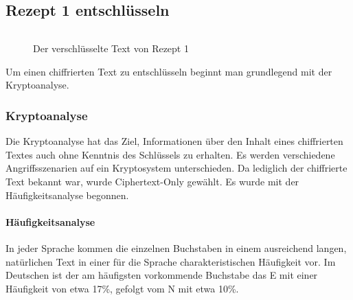 \subsection{Rezept 1 entschlüsseln}
\label{RezeptEinsEntschluesseln}

\begin{figure}
\begin{lstlisting}

\end{lstlisting}
\caption{Der verschlüsselte Text von Rezept 1}
\end{figure}

Um einen chiffrierten Text zu entschlüsseln beginnt man grundlegend mit der Kryptoanalyse. 

\subsubsection{Kryptoanalyse}

Die Kryptoanalyse hat das Ziel, Informationen über den Inhalt eines chiffrierten
Textes auch ohne Kenntnis des Schlüssels zu erhalten. Es werden verschiedene
Angriffsszenarien auf ein Kryptosystem unterschieden. Da lediglich der
chiffrierte Text bekannt war, wurde Ciphertext-Only gewählt. Es wurde mit der
Häufigkeitsanalyse begonnen.

\paragraph{Häufigkeitsanalyse}

In jeder Sprache kommen die einzelnen Buchstaben in einem ausreichend langen,
natürlichen Text in einer für die Sprache charakteristischen Häufigkeit vor. Im
Deutschen ist der am häufigsten vorkommende Buchstabe das E mit einer Häufigkeit
von etwa 17\%, gefolgt vom N mit etwa 10\%.

